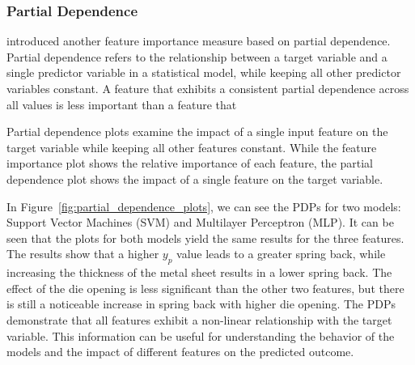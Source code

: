 \subsubsection{Partial Dependence}
\cite{greenwell2018simple} introduced another feature importance measure based on partial dependence.
Partial dependence refers to the relationship between a target variable and a single predictor variable in a statistical
model, while keeping all other predictor variables constant.
A feature that exhibits a consistent partial dependence across all values is less important than a feature that

Partial dependence plots examine the impact of a single input feature on the target variable while keeping all other
features constant.
While the feature importance plot shows the relative importance of each feature, the partial dependence plot shows
the impact of a single feature on the target variable.

In Figure~\ref{fig:partial_dependence_plots}, we can see the PDPs for two models: Support Vector Machines (SVM) and
Multilayer Perceptron (MLP).
It can be seen that the plots for both models yield the same results for the three features.
The results show that a higher $y_p$ value leads to a greater spring back, while
increasing the thickness of the metal sheet results in a lower spring back.
The effect of the die opening is less
significant than the other two features, but there is still a noticeable increase in spring back with higher die
opening.
The PDPs demonstrate that all features exhibit a non-linear relationship with the target variable.
This information can be useful for understanding the behavior of the models and the impact of different features on
the predicted outcome.

